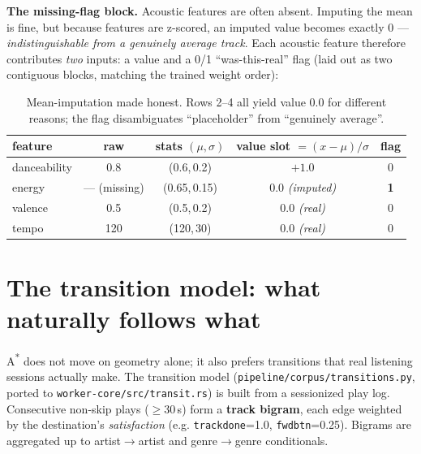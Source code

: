 \documentclass[11pt]{article}
\newcommand{\file}[1]{\texttt{\small #1}}
\newcommand{\code}[1]{\texttt{\small #1}}
\begin{document}
\textbf{The missing-flag block.} Acoustic features are often absent. Imputing the mean is fine, but
because features are z-scored, an imputed value becomes exactly $0$ --- \emph{indistinguishable from a
genuinely average track}. Each acoustic feature therefore contributes \emph{two} inputs: a value and
a 0/1 ``was-this-real'' flag (laid out as two contiguous blocks, matching the trained weight order):

\begin{table}[H]\centering\small
\caption{Mean-imputation made honest. Rows 2--4 all yield value $0.0$ for different reasons; the flag
disambiguates ``placeholder'' from ``genuinely average''.}
\label{tab:flag}
\begin{tabular}{@{}lcccc@{}}
\toprule
feature & raw & stats $(\mu,\sigma)$ & value slot $=(x-\mu)/\sigma$ & flag \\
\midrule
danceability & 0.8 & (0.6,\,0.2) & $+1.0$ & 0 \\
energy & --- (missing) & (0.65,\,0.15) & $0.0$ \emph{(imputed)} & \textbf{1} \\
valence & 0.5 & (0.5,\,0.2) & $0.0$ \emph{(real)} & 0 \\
tempo & 120 & (120,\,30) & $0.0$ \emph{(real)} & 0 \\
\bottomrule
\end{tabular}
\end{table}

\section{The transition model: what naturally follows what}
\label{sec:transit}

A\textsuperscript{*} does not move on geometry alone; it also prefers transitions that real listening
sessions actually make. The transition model (\file{pipeline/corpus/transitions.py}, ported to
\file{worker-core/src/transit.rs}) is built from a sessionized play log. Consecutive non-skip plays
($\ge 30$\,s) form a \textbf{track bigram}, each edge weighted by the destination's
\emph{satisfaction} (e.g. \code{trackdone}=1.0, \code{fwdbtn}=0.25). Bigrams are aggregated up to
artist$\to$artist and genre$\to$genre conditionals.
\end{document}
